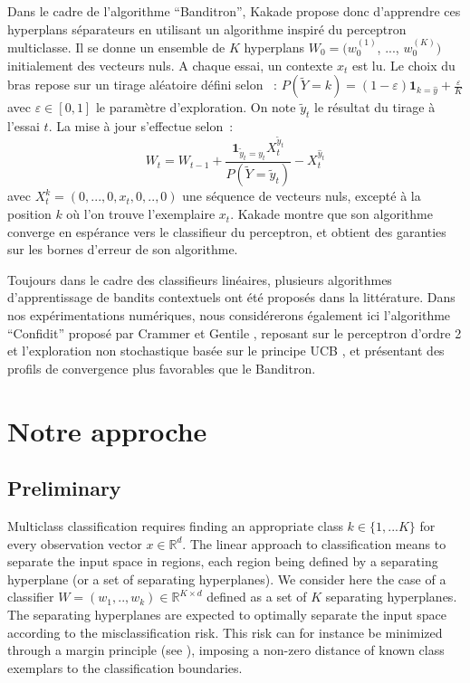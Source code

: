 \documentclass[preprint,12pt,authoryear]{elsarticle}
\begin{document}
Dans le cadre de l'algorithme ``Banditron'', Kakade propose donc d'apprendre ces hyperplans séparateurs en utilisant un algorithme inspiré du perceptron multiclasse. Il se donne un ensemble de $K$ hyperplans $W_0 = (w^{(1)}_0$, ..., $w^{(K)}_0)$ initialement des vecteurs nuls. A chaque essai, un contexte $x_t$ est lu. Le choix du bras repose sur un tirage aléatoire défini selon~ : $P(\tilde{Y}=k) = (1 - \varepsilon) \mathbf{1}_{k = \hat{y}} + \frac{\varepsilon}{K} $ avec $\varepsilon \in [0,1]$ le paramètre d'exploration. On note $\tilde{y}_t$ le résultat du tirage à l'essai $t$. La mise à jour s'effectue selon~:
$$ W_t = W_{t-1} + \frac{\mathbf{1}_{\tilde{y}_t = y_t} X_t^{\tilde{y}_t}}{P(\tilde{Y}=\tilde{y}_t)} - X_t^{\hat{y}_t}$$   
avec $X_t^k = (0, ..., 0,  x_t, 0, .., 0)$ une séquence de vecteurs nuls, excepté à la position $k$ où l'on trouve l'exemplaire $x_t$. Kakade montre que son algorithme converge en espérance vers le classifieur du perceptron, et obtient des garanties sur les bornes d'erreur de son algorithme. 

Toujours dans le cadre des classifieurs linéaires, plusieurs algorithmes d'apprentissage de bandits contextuels ont été proposés dans la littérature. Dans nos expérimentations numériques, nous considérerons également ici l'algorithme ``Confidit'' proposé par Crammer et Gentile \cite{crammer2013multiclass}, reposant sur le perceptron d'ordre 2 et l'exploration non stochastique basée sur le principe UCB \cite{lai1985asymptotically}, et présentant des profils de convergence plus favorables que le Banditron. 

\section{Notre approche}

\subsection{Preliminary}

Multiclass classification requires  finding an appropriate class $k \in \{1,... K\}$ for every observation vector $x \in \mathbb{R}^d$.
The linear approach to classification means to separate the input space in regions, each region being defined by a separating hyperplane (or a set of separating hyperplanes). We consider here the case of a  classifier $W = (w_1,..,w_k) \in \mathbb{R}^{K \times d}$ defined as a set of $K$ separating hyperplanes. The separating hyperplanes are expected to optimally separate the input space according to the misclassification risk. This risk can for instance be minimized through a margin principle (see \cite{vapnik1998statistical}), imposing a non-zero distance of known class exemplars to the classification boundaries. 
\end{document}
